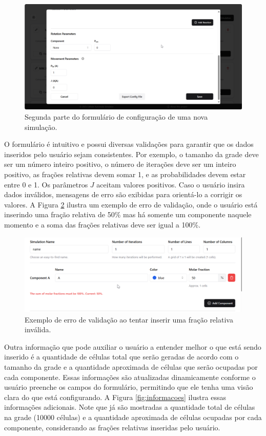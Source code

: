 \documentclass[12pt,oneside]{report}
\begin{document}
\begin{figure}[H]
    \centering
    \includegraphics[width=1\textwidth]{img/interface_configuracao2.png}
    \caption{\small Segunda parte do formulário de configuração de uma nova simulação.}
    \label{fig:interface_configuracao2}
\end{figure}

O formulário é intuitivo e possui diversas validações para garantir que os dados inseridos pelo usuário sejam consistentes. Por exemplo, o tamanho da grade deve ser um número inteiro positivo, o número de iterações deve ser um inteiro positivo, as frações relativas devem somar 1, e as probabilidades devem estar entre 0 e 1. Os parâmetros $J$ aceitam valores positivos. Caso o usuário insira dados inválidos, mensagens de erro são exibidas para orientá-lo a corrigir os valores. A Figura \ref{fig:validacao} ilustra um exemplo de erro de validação, onde o usuário está inserindo uma fração relativa de 50\% mas há somente um componente naquele momento e a soma das frações relativas deve ser igual a 100\%.

\begin{figure}[H]
    \centering
    \includegraphics[width=1\textwidth]{img/validacao.png}
    \caption{\small Exemplo de erro de validação ao tentar inserir uma fração relativa inválida.}
    \label{fig:validacao}
\end{figure}

Outra informação que pode auxiliar o usuário a entender melhor o que está sendo inserido é a quantidade de células total que serão geradas de acordo com o tamanho da grade e a quantidade aproximada de células que serão ocupadas por cada componente. Essas informações são atualizadas dinamicamente conforme o usuário preenche os campos do formulário, permitindo que ele tenha uma visão clara do que está configurando. A Figura \ref{fig:informacoes} ilustra essas informações adicionais. Note que já são mostradas a quantidade total de células na grade (10000 células) e a quantidade aproximada de células ocupadas por cada componente, considerando as frações relativas inseridas pelo usuário.
\end{document}
